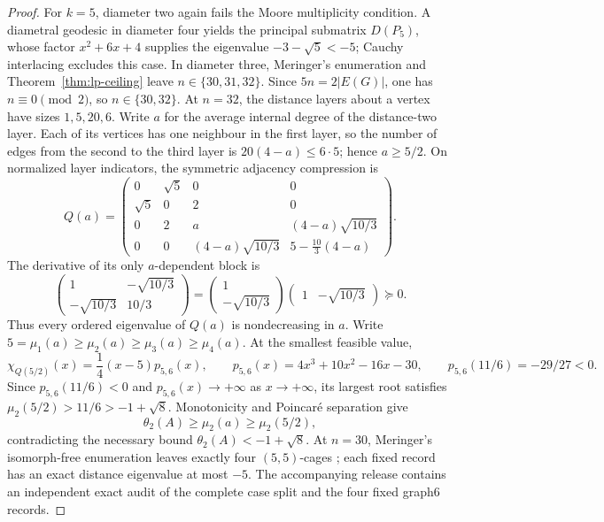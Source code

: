 \documentclass[a4paper,10pt,reqno]{amsart}
\theoremstyle{plain}
\theoremstyle{definition}
\theoremstyle{remark}
\begin{document}
\begin{proof}
For \(k=5\), diameter two again fails the Moore multiplicity condition.
A diametral geodesic in diameter four yields the principal submatrix
\(D(P_5)\), whose factor \(x^2+6x+4\) supplies the eigenvalue
\(-3-\sqrt5<-5\); Cauchy interlacing excludes this case.  In diameter
three, Meringer's enumeration \cite[p.~142]{Meringer1999} and
Theorem~\ref{thm:lp-ceiling} leave \(n\in\{30,31,32\}\).  Since
\(5n=2|E(G)|\), one has
\(n\equiv0\pmod2\), so \(n\in\{30,32\}\).  At \(n=32\), the distance
layers about a vertex have sizes \(1,5,20,6\).  Write \(a\) for the average
internal degree of the distance-two layer.  Each of its vertices has one
neighbour in the first layer, so the number of edges from the second to the
third layer is \(20(4-a)\le6\cdot5\); hence \(a\ge5/2\).  On normalized
layer indicators, the symmetric adjacency compression is
\[
 Q(a)=
 \begin{pmatrix}
 0&\sqrt5&0&0\\
 \sqrt5&0&2&0\\
 0&2&a&(4-a)\sqrt{10/3}\\
 0&0&(4-a)\sqrt{10/3}&5-\frac{10}{3}(4-a)
 \end{pmatrix}.
\]
The derivative of its only \(a\)-dependent block is
\[
 \begin{pmatrix}1&-\sqrt{10/3}\\-\sqrt{10/3}&10/3\end{pmatrix}
 =
 \begin{pmatrix}1\\-\sqrt{10/3}\end{pmatrix}
 \begin{pmatrix}1&-\sqrt{10/3}\end{pmatrix}\succeq0.
\]
Thus every ordered eigenvalue of \(Q(a)\) is nondecreasing in \(a\).  Write
\(5=\mu_1(a)\ge\mu_2(a)\ge\mu_3(a)\ge\mu_4(a)\).
At the smallest feasible value,
\[
 \chi_{Q(5/2)}(x)=\frac14(x-5)p_{5,6}(x),
 \qquad
 p_{5,6}(x)=4x^3+10x^2-16x-30,
 \qquad p_{5,6}(11/6)=-29/27<0.
\]
Since \(p_{5,6}(11/6)<0\) and \(p_{5,6}(x)\to+\infty\) as
\(x\to+\infty\), its largest root satisfies
\(\mu_2(5/2)>11/6>-1+\sqrt8\).  Monotonicity and Poincaré separation give
\[
 \theta_2(A)\ge\mu_2(a)\ge\mu_2(5/2),
\]
contradicting the necessary bound \(\theta_2(A)<-1+\sqrt8\).  At \(n=30\),
Meringer's isomorph-free enumeration leaves exactly four
\((5,5)\)-cages \cite[p.~142]{Meringer1999}; each fixed record has an exact
distance eigenvalue at most \(-5\).
The accompanying release contains an independent exact audit of the complete
case split and the four fixed graph6 records.
\end{proof}
\end{document}
